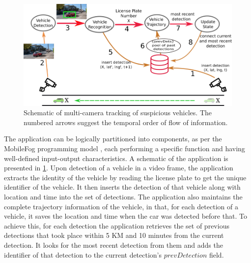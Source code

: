 \begin{figure}
\includegraphics[width=\columnwidth]{figures/fogstore/vehicleTrackingFlow.png}
\caption{Schematic of multi-camera tracking of suspicious vehicles. The numbered arrows suggest the temporal order of flow of information.}
\label{fig:usecase-schematic}
\end{figure}

\par The application can be logically partitioned into components, as per the MobileFog programming model \cite{mobilefog}, each performing a specific function and having well-defined input-output characteristics. A schematic of the application is presented in \cref{fig:usecase-schematic}. Upon detection of a vehicle in a video frame, the application extracts the identity of the vehicle by reading the license plate to get the unique identifier of the vehicle. It then inserts the detection of that vehicle along with location and time into the set of detections. The application also maintains the complete trajectory information of the vehicle, in that, for each detection of a vehicle, it saves the location and time when the car was detected before that. To achieve this, for each detection the application retrieves the set of previous detections that took place within 5 KM and 10 minutes from the current detection. It looks for the most recent detection from them and adds the identifier of that detection to the current detection's $prevDetection$ field.

